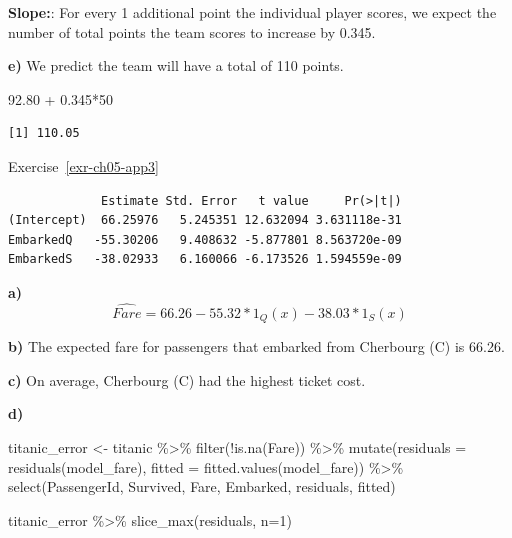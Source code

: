 \documentclass[
  letterpaper,
  DIV=11,
  numbers=noendperiod]{scrreprt}
\newenvironment{Shaded}{\begin{snugshade}}{\end{snugshade}}
\newcommand{\AttributeTok}[1]{\textcolor[rgb]{0.40,0.45,0.13}{#1}}
\newcommand{\DecValTok}[1]{\textcolor[rgb]{0.68,0.00,0.00}{#1}}
\newcommand{\FloatTok}[1]{\textcolor[rgb]{0.68,0.00,0.00}{#1}}
\newcommand{\FunctionTok}[1]{\textcolor[rgb]{0.28,0.35,0.67}{#1}}
\newcommand{\NormalTok}[1]{\textcolor[rgb]{0.00,0.23,0.31}{#1}}
\newcommand{\OtherTok}[1]{\textcolor[rgb]{0.00,0.23,0.31}{#1}}
\newcommand{\SpecialCharTok}[1]{\textcolor[rgb]{0.37,0.37,0.37}{#1}}
\theoremstyle{definition}
\theoremstyle{remark}
\begin{document}
\textbf{Slope:}: For every 1 additional point the individual player
scores, we expect the number of total points the team scores to increase
by 0.345.

\textbf{e)} We predict the team will have a total of 110 points.

\begin{Shaded}
\begin{Highlighting}[]
\FloatTok{92.80} \SpecialCharTok{+} \FloatTok{0.345}\SpecialCharTok{*}\DecValTok{50}
\end{Highlighting}
\end{Shaded}

\begin{verbatim}
[1] 110.05
\end{verbatim}

Exercise~\ref{exr-ch05-app3}

\begin{Shaded}
\end{Shaded}

\begin{verbatim}
             Estimate Std. Error   t value     Pr(>|t|)
(Intercept)  66.25976   5.245351 12.632094 3.631118e-31
EmbarkedQ   -55.30206   9.408632 -5.877801 8.563720e-09
EmbarkedS   -38.02933   6.160066 -6.173526 1.594559e-09
\end{verbatim}

\textbf{a)} \[\widehat{Fare} = 66.26 - 55.32*1_Q(x)-38.03*1_S(x)\]

\textbf{b)} The expected fare for passengers that embarked from
Cherbourg (C) is 66.26.

\textbf{c)} On average, Cherbourg (C) had the highest ticket cost.

\textbf{d)}

\begin{Shaded}
\begin{Highlighting}[]
\NormalTok{titanic\_error }\OtherTok{\textless{}{-}}\NormalTok{ titanic }\SpecialCharTok{\%\textgreater{}\%} 
  \FunctionTok{filter}\NormalTok{(}\SpecialCharTok{!}\FunctionTok{is.na}\NormalTok{(Fare)) }\SpecialCharTok{\%\textgreater{}\%} 
  \FunctionTok{mutate}\NormalTok{(}\AttributeTok{residuals =} \FunctionTok{residuals}\NormalTok{(model\_fare),}
         \AttributeTok{fitted =} \FunctionTok{fitted.values}\NormalTok{(model\_fare)) }\SpecialCharTok{\%\textgreater{}\%} 
  \FunctionTok{select}\NormalTok{(PassengerId, Survived, Fare, }
\NormalTok{         Embarked, residuals, fitted)}

\NormalTok{titanic\_error }\SpecialCharTok{\%\textgreater{}\%} 
  \FunctionTok{slice\_max}\NormalTok{(residuals, }\AttributeTok{n=}\DecValTok{1}\NormalTok{)}
\end{Highlighting}
\end{Shaded}
\end{document}
